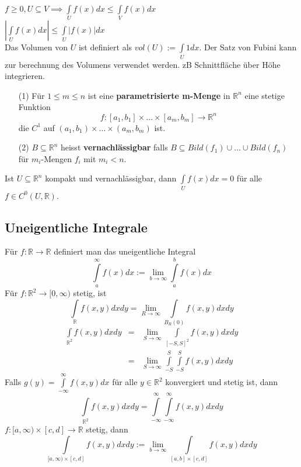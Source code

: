     $f\geq0,U\subseteq V\implies\int\limits_Uf(x)dx\leq\int\limits_Vf(x)dx$\\
    $\left|\int\limits_Uf(x)dx\right|\leq\int\limits_U\left|f(x)\right|dx$\\
    Das Volumen von $U$ ist definiert als $vol(U):=\int\limits_U1dx$. Der Satz von
    Fubini kann zur berechnung des Volumens verwendet werden. zB Schnittfläche
    über Höhe integrieren.\\
    \begin{enumerate}
      \item[(1)] Für $1\leq m\leq n$ ist eine \textbf{parametrisierte m-Menge} 
        in $\mathbb R^n$ eine stetige Funktion
        $$f:[a_1,b_1]\times\dots\times[a_m,b_m]\rightarrow\mathbb R^n$$ die
        $C^1$ auf $(a_1,b_1)\times\dots\times(a_m,b_m)$ ist.
      \item[(2)] $B\subseteq\mathbb R^n$ heisst \textbf{vernachlässigbar} falls
        $B\subseteq Bild(f_1)\cup\dots\cup Bild(f_n)$ für $m_i$-Mengen $f_i$ mit
        $m_i<n$.
    \end{enumerate}
    Ist $U\subseteq\mathbb R^n$ kompakt und vernachlässigbar, dann
    $\int\limits_{U}f(x)dx=0$ für alle $f\in C^0(U,\mathbb R)$.\\
\subsection{Uneigentliche Integrale}
  Für $f:\mathbb R\rightarrow\mathbb R$ definiert man das uneigentliche Integral
  $$\int\limits_a^\infty
  f(x)dx:=\lim\limits_{b\rightarrow\infty}\int\limits_a^bf(x)dx$$
    Für $f:\mathbb R^2\rightarrow[0,\infty)$ stetig, ist $$\int\limits_{\mathbb
    R}f(x,y)dxdy=\lim\limits_{R\rightarrow\infty}\int\limits_{B_R(0)}f(x,y)dxdy$$
    $$\begin{array}{lcl}
      \int\limits_{\mathbb R^2}f(x,y)dxdy &=&
      \lim\limits_{S\rightarrow\infty}\int\limits_{[-S,S]^2}f(x,y)dxdy\\
      &=&\lim\limits_{S\rightarrow\infty}\int\limits_{-S}^S\int\limits_{-S}^Sf(x,y)dxdy
    \end{array}$$
    Falls $g(y)=\int\limits_{-\infty}^\infty f(x,y)dx$ für alle $y\in\mathbb
    R^2$ konvergiert und stetig ist, dann $$\int\limits_{\mathbb
    R^2}f(x,y)dxdy=\int\limits_{-\infty}^\infty\int\limits_{-\infty}^\infty
    f(x,y)dxdy$$
      $f:[a,\infty)\times[c,d]\rightarrow\mathbb R$ stetig, dann
      $$\int\limits_{[a,\infty)\times[c,d]}f(x,y)dxdy:=\lim\limits_{b\rightarrow\infty}
      \int\limits_{[a,b]\times[c,d]}f(x,y)dxdy$$
